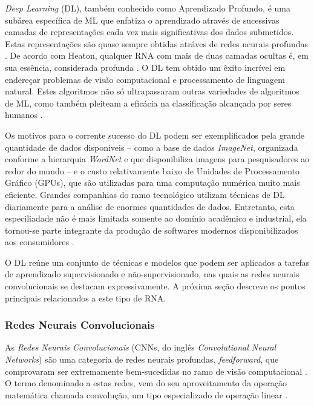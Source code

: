 
\emph{Deep Learning} (DL), também conhecido como Aprendizado Profundo, é uma subárea específica de ML que enfatiza o aprendizado através de sucessivas camadas de representações cada vez mais significativas dos dados submetidos. Estas representações são quase sempre obtidas atráves de redes neurais profundas \cite{chollet}. De acordo com Heaton, qualquer RNA com mais de duas camadas ocultas é, em sua essência, considerada profunda \cite{heaton}. O DL tem obtido um êxito incrível em endereçar problemas de visão computacional e processamento de linguagem natural. Estes algoritmos não só ultrapassaram outras variedades de algoritmos de ML, como também pleiteam a eficácia na classificação alcançada por seres humanos \cite{buduma}.

Os motivos para o corrente sucesso do DL podem ser exemplificados pela grande quantidade de dados disponíveis -- como a base de dados \emph{ImageNet}, organizada conforme a hierarquia \emph{WordNet} e que disponibiliza imagens para pesquisadores ao redor do mundo \cite{imagenet} -- e o custo relativamente baixo de Unidades de Processamento Gráfico (GPUs), que são utilizadas para uma computação numérica muito mais eficiente. Grandes companhias do ramo tecnológico utilizam técnicas de DL diariamente para a análise de enormes quantidades de dados. Entretanto, esta especiliadade não é mais limitada somente ao domínio acadêmico e industrial, ela tornou-se parte integrante da produção de softwares modernos disponibilizados aos consumidores \cite{gulli}.

O DL reúne um conjunto de técnicas e modelos que podem ser aplicados a tarefas de aprendizado supervisionado e não-supervisionado, nas quais as redes neurais convolucionais se destacam expressivamente. A próxima seção descreve os pontos principais relacionados a este tipo de RNA.

\subsubsection{Redes Neurais Convolucionais}
\label{subsubsec:cnns}

As \emph{Redes Neurais Convolucionais} (CNNs, do inglês \emph{Convolutional Neural Networks}) são uma categoria de redes neurais profundas, \emph{feedforward}, que comprovaram ser extremamente bem-sucedidas no ramo de visão computacional \cite{khan}. O termo denominado a estas redes, vem do seu aproveitamento da operação matemática chamada convolução, um tipo especializado de operação linear \cite{goodfellow}.

